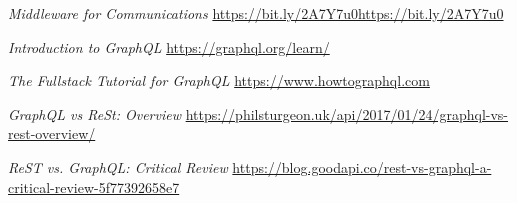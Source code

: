 \documentclass[10pt,journal,compsoc]{IEEEtran}
\begin{document}
%
%
%
\begin{thebibliography}{1}

\emph{Middleware for Communications}
\url{https://bit.ly/2A7Y7u0https://bit.ly/2A7Y7u0}

\emph{Introduction to GraphQL}
\url{https://graphql.org/learn/}
  
\emph{The Fullstack Tutorial for GraphQL}
\url{https://www.howtographql.com}

\emph{GraphQL vs ReSt: Overview}
\url{https://philsturgeon.uk/api/2017/01/24/graphql-vs-rest-overview/}

\emph{ReST vs. GraphQL: Critical Review}
\url{https://blog.goodapi.co/rest-vs-graphql-a-critical-review-5f77392658e7}




\end{thebibliography}

% 
\end{document}
